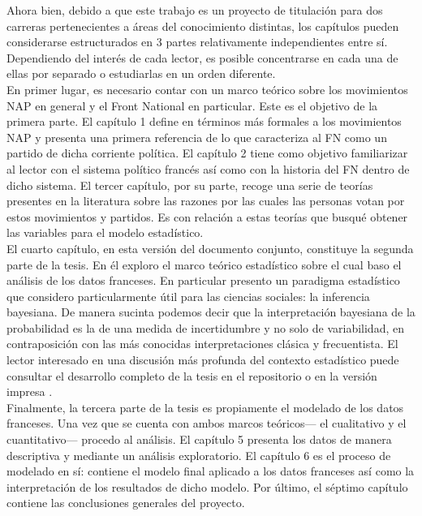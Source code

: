 Ahora bien, debido a que este trabajo es un proyecto de titulación para dos carreras pertenecientes a áreas del conocimiento distintas, los capítulos pueden considerarse estructurados en 3 partes relativamente independientes entre sí. Dependiendo del interés de cada lector, es posible concentrarse en cada una de ellas por separado o estudiarlas en un orden diferente.\\ 

En primer lugar, es necesario contar con un marco teórico sobre los movimientos NAP en general y el Front National en particular. Este es el objetivo de la primera parte. El capítulo 1 define en términos más formales a los movimientos NAP y presenta una primera referencia de lo que caracteriza al FN como un partido de dicha corriente política. El capítulo 2 tiene como objetivo familiarizar al lector con el sistema político francés así como con la historia del FN dentro de dicho sistema. El tercer capítulo, por su parte, recoge una serie de teorías presentes en la literatura sobre las razones por las cuales las personas votan por estos movimientos y partidos. Es con relación a estas teorías que busqué obtener las variables para el modelo estadístico.\\

El cuarto capítulo, en esta versión del documento conjunto, constituye la segunda parte de la tesis. En él exploro el marco teórico estadístico sobre el cual baso el análisis de los datos franceses. En particular presento un paradigma estadístico que considero particularmente útil para las ciencias sociales: la inferencia bayesiana. De manera sucinta podemos decir que la interpretación bayesiana de la probabilidad es la de una medida de incertidumbre y no solo de variabilidad, en contraposición con las más conocidas interpretaciones clásica y frecuentista. El lector interesado en una discusión más profunda del contexto estadístico puede consultar el desarrollo completo de la tesis en el repositorio o en la versión impresa \parencite{TesisAct}.\\

Finalmente, la tercera parte de la tesis es propiamente el modelado de los datos franceses. Una vez que se cuenta con ambos marcos teóricos--- el cualitativo y el cuantitativo--- procedo al análisis. El capítulo 5 presenta los datos de manera descriptiva y mediante un análisis exploratorio. El capítulo 6 es el proceso de modelado en sí: contiene el modelo final aplicado a los datos franceses así como la interpretación de los resultados de dicho modelo. Por último, el séptimo capítulo contiene las conclusiones generales del proyecto.\\ 
